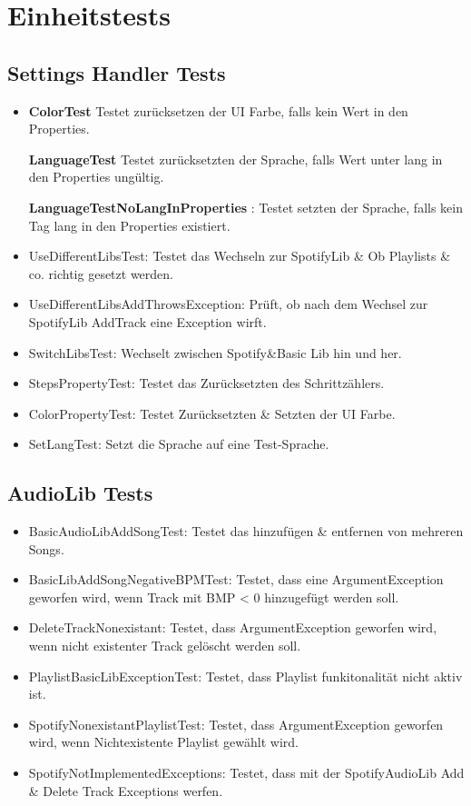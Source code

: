 \documentclass[../validierung.tex]{subfiles}
\begin{document}
	\section{Einheitstests}
		\subsection{Settings Handler Tests}
			\begin{itemize}
				\item\textbf{ColorTest} Testet zurücksetzen der UI Farbe, falls kein Wert in den Properties.
				\item[\textbf{LanguageTest}] Testet zurücksetzten der Sprache, falls Wert unter lang in den Properties ungültig.
				\item[\textbf{LanguageTestNoLangInProperties}]: Testet setzten der Sprache, falls kein Tag lang in den Properties existiert.
				\item UseDifferentLibsTest: Testet das Wechseln zur SpotifyLib \& Ob Playlists \& co. richtig gesetzt werden.
				\item UseDifferentLibsAddThrowsException: Prüft, ob nach dem Wechsel zur SpotifyLib AddTrack eine Exception wirft.
				\item SwitchLibsTest: Wechselt zwischen Spotify{\&}Basic Lib hin und her.
				\item StepsPropertyTest: Testet das Zurücksetzten des Schrittzählers.
				\item ColorPropertyTest: Testet Zurücksetzten \& Setzten der UI Farbe.
				\item SetLangTest: Setzt die Sprache auf eine Test-Sprache.
			\end{itemize}
		\subsection{AudioLib Tests}
			\begin{itemize}
				\item BasicAudioLibAddSongTest: Testet das hinzufügen \& entfernen von mehreren Songs.
				\item BasicLibAddSongNegativeBPMTest: Testet, dass eine ArgumentException geworfen wird, wenn Track mit BMP < 0 hinzugefügt werden soll.
				\item DeleteTrackNonexistant: Testet, dass ArgumentException geworfen wird, wenn nicht existenter Track gelöscht werden soll.
				\item PlaylistBasicLibExceptionTest: Testet, dass Playlist funkitonalität nicht aktiv ist.
				\item SpotifyNonexistantPlaylistTest: Testet, dass ArgumentException geworfen wird, wenn Nichtexistente Playlist gewählt wird.
				\item SpotifyNotImplementedExceptions: Testet, dass mit der SpotifyAudioLib Add \& Delete Track Exceptions werfen.
			\end{itemize}
\end{document}
